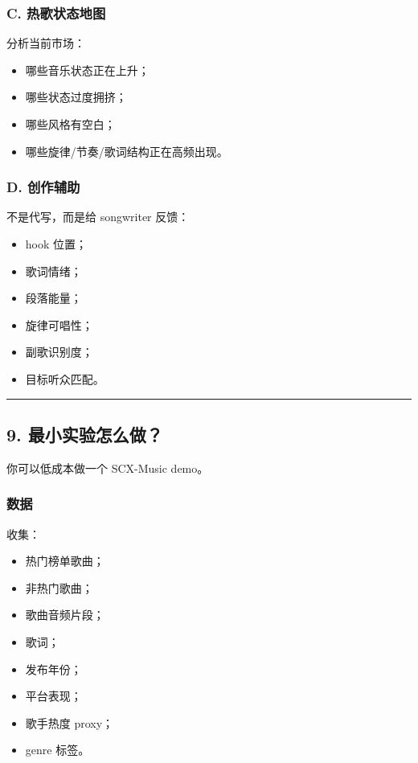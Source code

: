 \documentclass[
  12pt,
]{ctexart}
\providecommand{\tightlist}{%
  \setlength{\itemsep}{0pt}\setlength{\parskip}{0pt}}
\begin{document}
\subsubsection{C.
热歌状态地图}\label{c.-ux70edux6b4cux72b6ux6001ux5730ux56fe}

分析当前市场：

\begin{itemize}
\tightlist
\item
  哪些音乐状态正在上升；
\item
  哪些状态过度拥挤；
\item
  哪些风格有空白；
\item
  哪些旋律/节奏/歌词结构正在高频出现。
\end{itemize}

\subsubsection{D. 创作辅助}\label{d.-ux521bux4f5cux8f85ux52a9}

不是代写，而是给 songwriter 反馈：

\begin{itemize}
\tightlist
\item
  hook 位置；
\item
  歌词情绪；
\item
  段落能量；
\item
  旋律可唱性；
\item
  副歌识别度；
\item
  目标听众匹配。
\end{itemize}

\begin{center}\rule{0.5\linewidth}{0.5pt}\end{center}

\subsection{9.
最小实验怎么做？}\label{ux6700ux5c0fux5b9eux9a8cux600eux4e48ux505a-1}

你可以低成本做一个 SCX-Music demo。

\subsubsection{数据}\label{ux6570ux636e}

收集：

\begin{itemize}
\tightlist
\item
  热门榜单歌曲；
\item
  非热门歌曲；
\item
  歌曲音频片段；
\item
  歌词；
\item
  发布年份；
\item
  平台表现；
\item
  歌手热度 proxy；
\item
  genre 标签。
\end{itemize}
\end{document}
